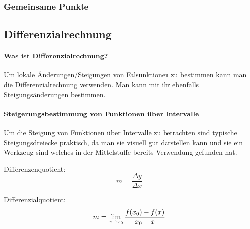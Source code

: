 \documentclass{article}
\begin{document}
\begin{figure}[H]
\centering
{}
\end{figure}    

\subsubsection{Gemeinsame Punkte}

\subsection{Differenzialrechnung}
\paragraph{Was ist Differenzialrechnung?}

Um lokale Änderungen/Steigungen von Falsunktionen zu bestimmen kann man die Differenzialrechnung verwenden.
Man kann mit ihr ebenfalls Steigungsänderungen bestimmen.
\paragraph{Steigerungsbestimmung von Funktionen über Intervalle}

Um die Steigung von Funktionen über Intervalle zu betrachten sind typische Steigungsdreiecke praktisch,
da man sie visuell gut darstellen kann und sie ein Werkzeug sind welches in der Mittelstuffe bereits
Verwendung gefunden hat.

Differenzenquotient:
\[
    m = {\frac {\Delta y} {\Delta x}}
\]

Differenzialquotient:
\[
    m = \lim_{x \to x_{0}} {{f(x_{0}) - f(x)} \over { x_{0} - x}}
\]



\paragraph{}
\end{document}
